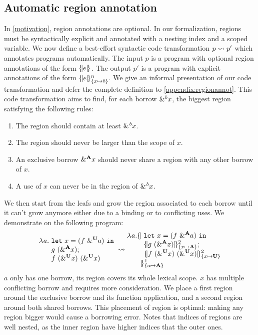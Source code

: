 
\subsection{Automatic region annotation}
\label{regionannot}

In \cref{motivation}, region annotations are optional.
In our formalization, regions must be syntactically explicit and annotated with
a nesting index and a scoped variable.
We now define a best-effort
syntactic code transformation $\RannotT{p}{p'}$ which
annotates programs automatically.
The input $p$ is a program with optional region annotations of the form $\region[]{}{e}$.
The output $p'$ is a program with explicit annotations
of the form $\region{\Sone x\BORROW}{e}$.
We give an informal presentation of our code transformation and defer
the complete definition to \cref{appendix:regionannot}. This code transformation
aims to find, for each borrow $\borrow{x}$, the biggest region satisfying
the following rules:
\begin{enumerate}
\item The region should contain at least $\borrow{x}$.
\item The region should never be larger than the scope of $x$.
\item An exclusive borrow $\borrow[\kaff]{x}$ should never share a region with any other borrow of $x$.
\item A use of $x$ can never be in the region of $\borrow{x}$.
\end{enumerate}
We then start from the leafs and grow the region
associated to each borrow until it can't grow anymore either due to a binding
or to conflicting uses. We demonstrate
on the following program:
%
\[
  \setlength{\jot}{-1pt}
  \RannotT{
\begin{aligned}
  \lam{a}{}\ &
  \letin{x}{\app{f}{\borrow[\kun]{a}}}{}\\
  &g\ (\borrow[\kaff]{x});\\
  &f\ (\borrow[\kun]{x})\ (\borrow[\kun]{x})\\
\end{aligned}
}{
\begin{aligned}
  \lam{a}{}\region[1]{\Sone a\MBORROW}{\ &%
  \letin{x}{\app{f}{\borrow[\kaff]{a}}}{}\\
  &\region[2]{\Sone x\MBORROW}{g\ (\borrow[\kaff]{x})};\\
  &\region[2]{\Sone x\IBORROW}{f\ (\borrow[\kun]{x})\ (\borrow[\kun]{x})}\\
  &\!\!\!}
\end{aligned}
}
\]
%
$a$ only has one borrow, its region covers its whole lexical scope.
$x$ has multiple conflicting borrow and requires more consideration.
We place a first
region around the exclusive borrow and its function application,
and a second region around both shared borrows. This placement of region
is optimal: making any region bigger would cause a borrowing
error.
Notes that indices of regions are well nested, as the inner region have
higher indices that the outer ones.

